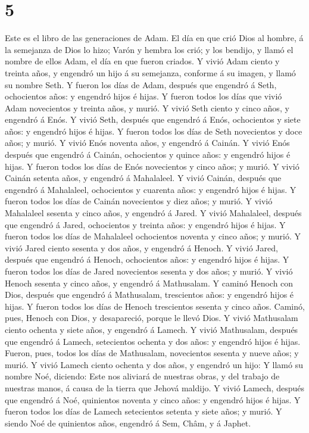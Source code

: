 \hypertarget{section-4}{%
\section{5}\label{section-4}}

 Este es el libro de las generaciones de Adam. El día en que
crió Dios al hombre, á la semejanza de Dios lo hizo;  Varón
y hembra los crió; y los bendijo, y llamó el nombre de ellos Adam, el
día en que fueron criados.  Y vivió Adam ciento y treinta
años, y engendró un hijo á su semejanza, conforme á su imagen, y llamó
su nombre Seth.  Y fueron los días de Adam, después que
engendró á Seth, ochocientos años: y engendró hijos é hijas.
 Y fueron todos los días que vivió Adam novecientos y
treinta años, y murió.  Y vivió Seth ciento y cinco años, y
engendró á Enós.  Y vivió Seth, después que engendró á Enós,
ochocientos y siete años: y engendró hijos é hijas.  Y
fueron todos los días de Seth novecientos y doce años; y murió.
 Y vivió Enós noventa años, y engendró á Cainán.
 Y vivió Enós después que engendró á Cainán, ochocientos y
quince años: y engendró hijos é hijas.  Y fueron todos los
días de Enós novecientos y cinco años; y murió.  Y vivió
Cainán setenta años, y engendró á Mahalaleel.  Y vivió
Cainán, después que engendró á Mahalaleel, ochocientos y cuarenta años:
y engendró hijos é hijas.  Y fueron todos los días de
Cainán novecientos y diez años; y murió.  Y vivió
Mahalaleel sesenta y cinco años, y engendró á Jared.  Y
vivió Mahalaleel, después que engendró á Jared, ochocientos y treinta
años: y engendró hijos é hijas.  Y fueron todos los días de
Mahalaleel ochocientos noventa y cinco años; y murió.  Y
vivió Jared ciento sesenta y dos años, y engendró á Henoch.
 Y vivió Jared, después que engendró á Henoch, ochocientos
años: y engendró hijos é hijas.  Y fueron todos los días de
Jared novecientos sesenta y dos años; y murió.  Y vivió
Henoch sesenta y cinco años, y engendró á Mathusalam.  Y
caminó Henoch con Dios, después que engendró á Mathusalam, trescientos
años: y engendró hijos é hijas.  Y fueron todos los días de
Henoch trescientos sesenta y cinco años.  Caminó, pues,
Henoch con Dios, y desapareció, porque le llevó Dios.  Y
vivió Mathusalam ciento ochenta y siete años, y engendró á Lamech.
 Y vivió Mathusalam, después que engendró á Lamech,
setecientos ochenta y dos años: y engendró hijos é hijas. 
Fueron, pues, todos los días de Mathusalam, novecientos sesenta y nueve
años; y murió.  Y vivió Lamech ciento ochenta y dos años, y
engendró un hijo:  Y llamó su nombre Noé, diciendo: Este
nos aliviará de nuestras obras, y del trabajo de nuestras manos, á causa
de la tierra que Jehová maldijo.  Y vivió Lamech, después
que engendró á Noé, quinientos noventa y cinco años: y engendró hijos é
hijas.  Y fueron todos los días de Lamech setecientos
setenta y siete años; y murió.  Y siendo Noé de quinientos
años, engendró á Sem, Châm, y á Japhet.

